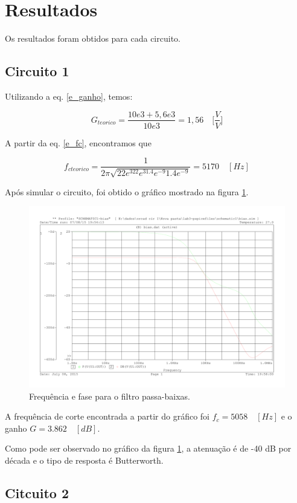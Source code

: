 \newpage
\section{Resultados}

Os resultados foram obtidos para cada circuito.

\subsection{Circuito 1}

Utilizando a eq. \ref{e_ganho}, temos:

\[
G_{teorico} = \frac{10e3+5,6e3}{10e3} = 1,56 \quad \bigg [ \frac{V}{V} \bigg ]
\]

A partir da eq. \ref{e_fc}, encontramos que

\[
f_{c teorico} = \frac{1}{2\pi\sqrt{22e^322e^31.4e^{-9}1.4e^{-9}}} = 5170 \quad [Hz]
\]

Após simular o circuito, foi obtido o gráfico mostrado na figura \ref{f_bode1}.

\begin{figure}[H]
\centering
\includegraphics[scale=0.5]{Imagens/bode1.pdf}
\caption{Frequência e fase para o filtro passa-baixas.}
\label{f_bode1}
\end{figure}
  
  A frequência de corte encontrada a partir do gráfico foi $f_c = 5058 \quad [Hz]$ e o ganho $G = 3.862 \quad [dB]$.
  
Como pode ser observado no gráfico da figura \ref{f_bode1}, a atenuação é de -40 dB por década e o tipo de resposta é Butterworth.

\subsection{Citcuito 2}

